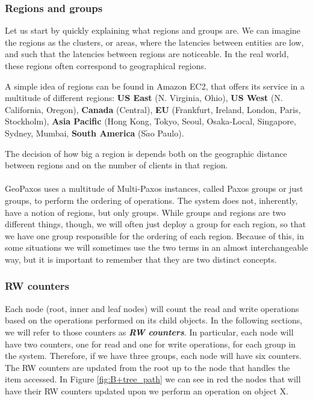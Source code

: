 \subsubsection{Regions and groups}
Let us start by quickly explaining what regions and groups are. We can imagine the regions as the clusters, or areas, where the latencies between entities are low, and such that the latencies between regions are noticeable. In the real world, these regions often correspond to geographical regions.

A simple idea of regions can be found in Amazon EC2\citep{amazonEC2}, that offers its service in a multitude of different regions: \textbf{US East} (N. Virginia, Ohio), \textbf{US West} (N. California, Oregon), \textbf{Canada} (Central), \textbf{EU} (Frankfurt, Ireland, London, Paris, Stockholm), \textbf{Asia Pacific} (Hong Kong, Tokyo, Seoul, Osaka-Local, Singapore, Sydney, Mumbai, \textbf{South America} (S$\tilde{a}$o Paulo).

The decision of how big a region is depends both on the geographic distance between regions and on the number of clients in that region.\\\\
GeoPaxos uses a multitude of Multi-Paxos instances, called Paxos groups or just groups, to perform the ordering of operations. The system does not, inherently, have a notion of regions, but only groups. While groups and regions are two different things, though, we will often just deploy a group for each region, so that we have one group responsible for the ordering of each region. Because of this, in some situations we will sometimes use the two terms in an almost interchangeable way, but it is important to remember that they are two distinct concepts.

\subsubsection{RW counters}
Each node (root, inner and leaf nodes) will count the read and write operations based on the operations performed on its child objects. In the following sections, we will refer to those counters as \textbf{\emph{RW counters}}. In particular, each node will have two counters, one for read and one for write operations, for each group in the system. Therefore, if we have three groups, each node will have six counters. The RW counters are updated from the root up to the node that handles the item accessed. In Figure \ref{fig:B+tree_path} we can see in red the nodes that will have their RW counters updated upon we perform an operation on object X. 


